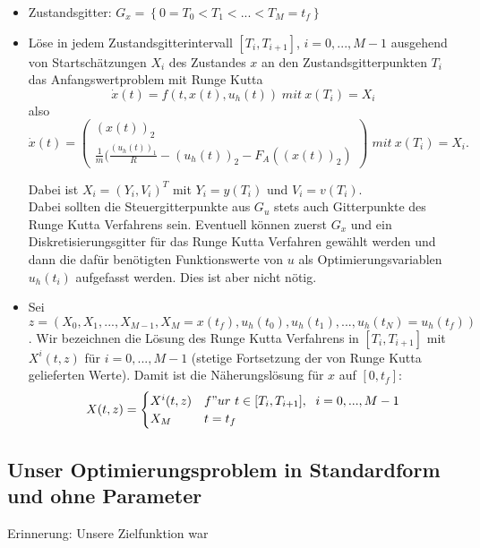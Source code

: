 \documentclass[12pt,a4paper]{article}
\theoremstyle{definition}
\theoremstyle{plain}
\begin{document}
	\begin{itemize}
		\item Zustandsgitter: $G_{x}=\left\{0=T_{0}< T_{1}< ... < T_{M}=t_{f}\right\}$
		\item Löse in jedem Zustandsgitterintervall $[T_{i}, T_{i+1}]$, $i=0,..., M-1$ ausgehend von Startschätzungen $X_{i}$ des Zustandes $x$ an den Zustandsgitterpunkten $T_{i}$ das Anfangswertproblem mit Runge Kutta
		\begin{equation*}
		\dot{x}(t)=f(t, x(t), u_{h}(t)) \; mit \  x(T_{i})=X_{i}
		\end{equation*}
		also
		\begin{equation*}
		\dot{x}(t)=\begin{pmatrix} (x(t))_{2}\\ \frac{1}{m}(\frac{(u_{h}(t))_{1}}{R}-(u_{h}(t))_{2}-F_{A}((x(t))_{2})
		\end{pmatrix} \; mit \  x(T_{i})=X_{i}.
		\end{equation*}
		
		Dabei ist $X_{i}=(Y_{i}, V_{i})^{T}$ mit $Y_{i}=y(T_{i})$ und $V_{i}=v(T_{i})$.
		\\ Dabei sollten die Steuergitterpunkte aus $G_{u}$ stets auch Gitterpunkte des Runge Kutta Verfahrens sein. Eventuell können zuerst $G_{x}$ und ein Diskretisierungsgitter für das Runge Kutta Verfahren gewählt werden und dann die dafür benötigten Funktionswerte von $u$ als Optimierungsvariablen $u_{h}(t_{i})$ aufgefasst werden. Dies ist aber nicht nötig.
	
		\item Sei $z=(X_{0},X_{1},...,X_{M-1},X_{M}=x(t_{f}), u_{h}(t_{0}), u_{h}(t_{1}), ..., u_{h}(t_{N})=u_{h}(t_{f}))$. Wir bezeichnen die Lösung des Runge Kutta Verfahrens in $[T_{i}, T_{i+1}]$ mit $X^{i}(t,z)$ für $i=0,...,M-1$ (stetige Fortsetzung der von Runge Kutta gelieferten Werte). Damit ist die Näherungslösung für $x$ auf $[0, t_{f}]$:
		\begin{equation*}
		X(t,z)=\begin{cases}
		X^{i}(t,z) & f"ur\ t\in [T_{i}, T_{i+1}], \  \; i=0,..., M-1 \\
		X_{M} & t=t_{f}
		\end{cases}
		\end{equation*}
		
		
	\end{itemize}
		
	
	\subsection{Unser Optimierungsproblem in Standardform und ohne Parameter}
	Erinnerung: Unsere Zielfunktion war
	
\end{document}
